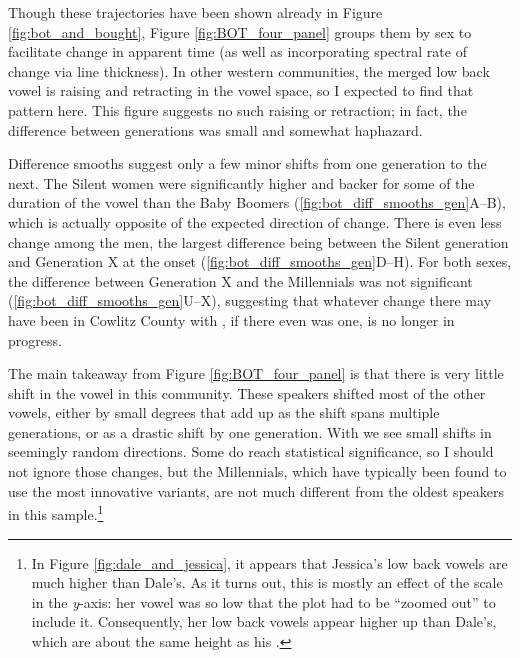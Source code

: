 Though these trajectories have been shown already in Figure \ref{fig:bot_and_bought}, Figure \ref{fig:BOT_four_panel} groups them by sex to facilitate change in apparent time (as well as incorporating spectral rate of change via line thickness). In other western communities, the merged low back vowel is raising and retracting in the vowel space, so I expected to find that pattern here. This figure suggests no such raising or retraction; in fact, the difference between generations was small and somewhat haphazard.

Difference smooths suggest only a few minor shifts from one generation to the next. The Silent women were significantly higher and backer for some of the duration of the vowel than the Baby Boomers (\ref{fig:bot_diff_smooths_gen}A--B), which is actually opposite of the expected direction of change. There is even less change among the men, the largest difference being between the Silent generation and Generation X at the onset (\ref{fig:bot_diff_smooths_gen}D--H). For both sexes, the difference between Generation X and the Millennials was not significant (\ref{fig:bot_diff_smooths_gen}U--X), suggesting that whatever change there may have been in Cowlitz County with \lot, if there even was one, is no longer in progress.

The main takeaway from Figure \ref{fig:BOT_four_panel} is that there is very little shift in the \lot vowel in this community. These speakers shifted most of the other vowels, either by small degrees that add up as the shift spans multiple generations, or as a drastic shift by one generation. With \lot we see small shifts in seemingly random directions. Some do reach statistical significance, so I should not ignore those changes, but the Millennials, which have typically been found to use the most innovative variants, are not much different from the oldest speakers in this sample.\footnote{In Figure \ref{fig:dale_and_jessica}, it appears that Jessica's low back vowels are much higher than Dale's. As it turns out, this is mostly an effect of the scale in the \textit{y}-axis: her \bat vowel was so low that the plot had to be ``zoomed out'' to include it. Consequently, her low back vowels appear higher up than Dale's, which are about the same height as his \bat.}

